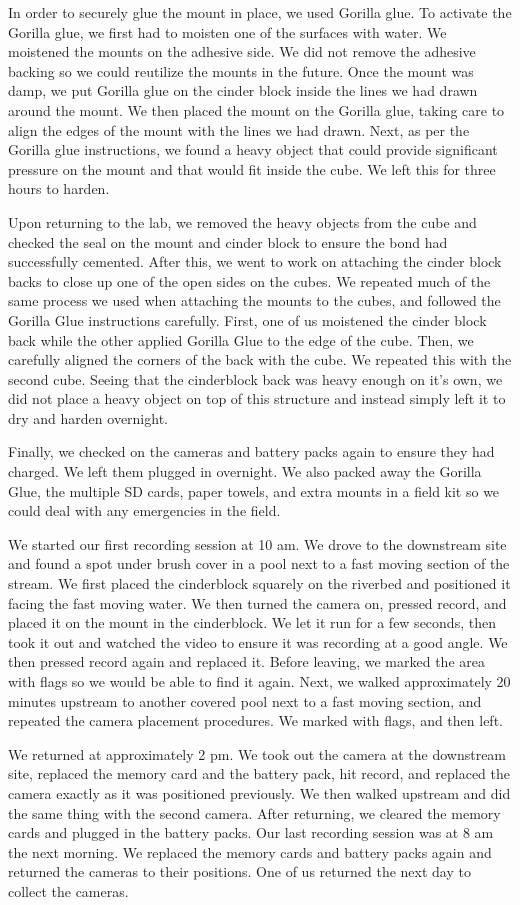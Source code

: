 \documentclass{article}\usepackage[]{graphicx}\usepackage[]{color}
\begin{document}
In order to securely glue the mount in place, we used Gorilla glue. To activate the Gorilla glue, we first had to moisten one of the surfaces with water. We moistened the mounts on the adhesive side. We did not remove the adhesive backing so we could reutilize the mounts in the future. Once the mount was damp, we put Gorilla glue on the cinder block inside the lines we had drawn around the mount. We then placed the mount on the Gorilla glue, taking care to align the edges of the mount with the lines we had drawn. Next, as per the Gorilla glue instructions, we found a heavy object that could provide significant pressure on the mount and that would fit inside the cube. We left this for three hours to harden.

Upon returning to the lab, we removed the heavy objects from the cube and checked the seal on the mount and cinder block to ensure the bond had successfully cemented. After this, we went to work on attaching the cinder block backs to close up one of the open sides on the cubes. We repeated much of the same process we used when attaching the mounts to the cubes, and followed the Gorilla Glue instructions carefully. First, one of us moistened the cinder block back while the other applied Gorilla Glue to the edge of the cube. Then, we carefully aligned the corners of the back with the cube. We repeated this with the second cube. Seeing that the cinderblock back was heavy enough on it’s own, we did not place a heavy object on top of this structure and instead simply left it to dry and harden overnight.

Finally, we checked on the cameras and battery packs again to ensure they had charged. We left them plugged in overnight. We also packed away the Gorilla Glue, the multiple SD cards, paper towels, and extra mounts in a field kit so we could deal with any emergencies in the field.

We started our first recording session at 10 am.  We drove to the downstream site and found a spot under brush cover in a pool next to a fast moving section of the stream.  We first placed the cinderblock squarely on the riverbed and positioned it facing the fast moving water.  We then turned the camera on, pressed record, and placed it on the mount in the cinderblock.  We let it run for a few seconds, then took it out and watched the video to ensure it was recording at a good angle.  We then pressed record again and replaced it.  Before leaving, we marked the area with flags so we would be able to find it again.
Next, we walked approximately 20 minutes upstream to another covered pool next to a fast moving section, and repeated the camera placement procedures.  We marked with flags, and then left.

We returned at approximately 2 pm.  We took out the camera at the downstream site, replaced the memory card and the battery pack, hit record, and replaced the camera exactly as it was positioned previously.  We then walked upstream and did the same thing with the second camera.  After returning, we cleared the memory cards and plugged in the battery packs.
Our last recording session was at 8 am the next morning.  We replaced the memory cards and battery packs again and returned the cameras to their positions.  One of us returned the next day to collect the cameras.
\end{document}
